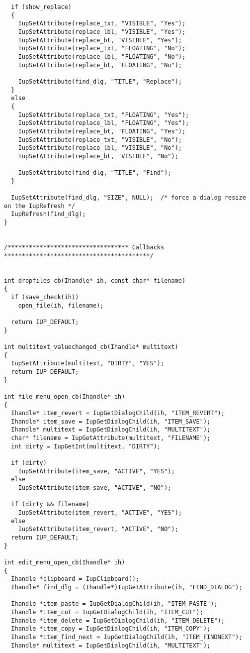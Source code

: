 \documentclass{ctexart}
\begin{document}
\begin{lstlisting}
  if (show_replace)
  {
    IupSetAttribute(replace_txt, "VISIBLE", "Yes");
    IupSetAttribute(replace_lbl, "VISIBLE", "Yes");
    IupSetAttribute(replace_bt, "VISIBLE", "Yes");
    IupSetAttribute(replace_txt, "FLOATING", "No");
    IupSetAttribute(replace_lbl, "FLOATING", "No");
    IupSetAttribute(replace_bt, "FLOATING", "No");

    IupSetAttribute(find_dlg, "TITLE", "Replace");
  }
  else
  {
    IupSetAttribute(replace_txt, "FLOATING", "Yes");
    IupSetAttribute(replace_lbl, "FLOATING", "Yes");
    IupSetAttribute(replace_bt, "FLOATING", "Yes");
    IupSetAttribute(replace_txt, "VISIBLE", "No");
    IupSetAttribute(replace_lbl, "VISIBLE", "No");
    IupSetAttribute(replace_bt, "VISIBLE", "No");

    IupSetAttribute(find_dlg, "TITLE", "Find");
  }

  IupSetAttribute(find_dlg, "SIZE", NULL);  /* force a dialog resize on the IupRefresh */
  IupRefresh(find_dlg);
}


/********************************** Callbacks *****************************************/


int dropfiles_cb(Ihandle* ih, const char* filename)
{
  if (save_check(ih))
    open_file(ih, filename);

  return IUP_DEFAULT;
}

int multitext_valuechanged_cb(Ihandle* multitext)
{
  IupSetAttribute(multitext, "DIRTY", "YES");
  return IUP_DEFAULT;
}

int file_menu_open_cb(Ihandle* ih)
{
  Ihandle* item_revert = IupGetDialogChild(ih, "ITEM_REVERT");
  Ihandle* item_save = IupGetDialogChild(ih, "ITEM_SAVE");
  Ihandle* multitext = IupGetDialogChild(ih, "MULTITEXT");
  char* filename = IupGetAttribute(multitext, "FILENAME");
  int dirty = IupGetInt(multitext, "DIRTY");

  if (dirty)
    IupSetAttribute(item_save, "ACTIVE", "YES");
  else
    IupSetAttribute(item_save, "ACTIVE", "NO");

  if (dirty && filename)
    IupSetAttribute(item_revert, "ACTIVE", "YES");
  else
    IupSetAttribute(item_revert, "ACTIVE", "NO");
  return IUP_DEFAULT;
}

int edit_menu_open_cb(Ihandle* ih)
{
  Ihandle *clipboard = IupClipboard(); 
  Ihandle* find_dlg = (Ihandle*)IupGetAttribute(ih, "FIND_DIALOG");

  Ihandle *item_paste = IupGetDialogChild(ih, "ITEM_PASTE");
  Ihandle *item_cut = IupGetDialogChild(ih, "ITEM_CUT");
  Ihandle *item_delete = IupGetDialogChild(ih, "ITEM_DELETE");
  Ihandle *item_copy = IupGetDialogChild(ih, "ITEM_COPY");
  Ihandle *item_find_next = IupGetDialogChild(ih, "ITEM_FINDNEXT");
  Ihandle* multitext = IupGetDialogChild(ih, "MULTITEXT");


\end{lstlisting}
\end{document}
